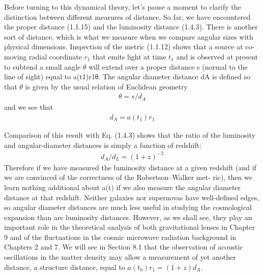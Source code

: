 \documentclass[12pt,a4paper]{article}
\theoremstyle{plain}
\theoremstyle{break}
\begin{document}
Before turning to this dynamical theory, let’s pause a moment to clarify the distinction between different measures of distance.
So far, we have encountered the proper distance (1.1.15) and the luminosity distance (1.4.3).
There is another sort of distance, which is what we measure when we compare angular sizes with physical dimensions.
Inspection of the metric (1.1.12) shows that a source at co-moving radial coordinate $r_1$ that emits light at time $t_1$ and is observed at present to subtend a small angle $\theta$ will extend over a proper distance s (normal to the line of sight) equal to a(t1)r1θ. The angular diameter distance dA is defined so that $\theta$ is given by the usual relation of Euclidean geometry
\begin{align}
  \theta = s/d_A
\end{align}
and we see that
\begin{align}
  d_A = a(t_1) r_1
\end{align}

Comparison of this result with Eq. (1.4.3) shows that the ratio of the luminosity and angular-diameter distances is simply a function of redshift:
\begin{align}
  d_{A} / d_{L}=(1+z)^{-2}
\end{align}
Therefore if we have measured the luminosity distance at a given redshift (and if we are convinced of the correctness of the Robertson–Walker met- ric), then we learn nothing additional about a(t) if we also measure the angular diameter distance at that redshift.
Neither galaxies nor supernovas have well-defined edges, so angular diameter distances are much less useful in studying the cosmological expansion than are luminosity distances. However, as we shall see, they play an important role in the theoretical analysis of both gravitational lenses in Chapter 9 and of the fluctuations in the cosmic microwave radiation background in Chapters 2 and 7.
We will see in Section 8.1 that the observation of acoustic oscillations in the matter density may allow a measurement of yet another distance, a structure distance, equal to $a(t_0)r_1 = (1 + z)d_A$.
\end{document}
